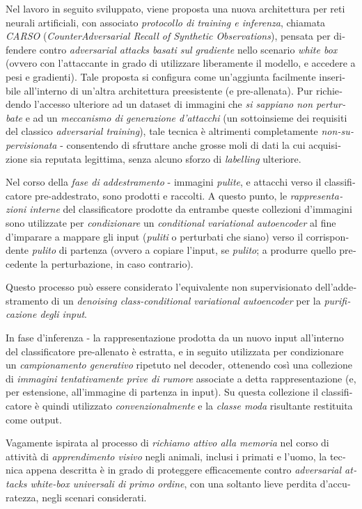 \begin{otherlanguage}{italian}
Nel lavoro in seguito sviluppato, viene proposta una nuova architettura per reti neurali artificiali, con associato \textit{protocollo di training e inferenza}, chiamata \textit{CARSO} (\textit{CounterAdversarial Recall of Synthetic Observations}), pensata per difendere contro \textit{adversarial attacks basati sul gradiente} nello scenario \textit{white box} (ovvero con l'attaccante in grado di utilizzare liberamente il modello, e accedere a pesi e gradienti). Tale proposta si configura come un'aggiunta facilmente inseribile all'interno di un'altra architettura preesistente (e pre-allenata). Pur richiedendo l'accesso ulteriore ad un dataset di immagini che \textit{si sappiano non perturbate} e ad un \textit{meccanismo di generazione d'attacchi} (un sottoinsieme dei requisiti del classico \textit{adversarial training}), tale tecnica è altrimenti completamente \textit{non-supervisionata} - consentendo di sfruttare anche grosse moli di dati la cui acquisizione sia reputata legittima, senza alcuno sforzo di \textit{labelling} ulteriore.

Nel corso della \textit{fase di addestramento} - immagini \textit{pulite}, e attacchi verso il classificatore pre-addestrato, sono prodotti e raccolti. A questo punto, le \textit{rappresentazioni interne} del classificatore prodotte da entrambe queste collezioni d'immagini sono utilizzate per \textit{condizionare} un \textit{conditional variational autoencoder} al fine d'imparare a mappare gli input (\textit{puliti} o perturbati che siano) verso il corrispondente \textit{pulito} di partenza (ovvero a copiare l'input, se \textit{pulito}; a produrre quello precedente la perturbazione, in caso contrario).

Questo processo può essere considerato l'equivalente non supervisionato dell'addestramento di un \textit{denoising class-conditional variational autoencoder} per la \textit{purificazione degli input}.

In fase d'inferenza - la rappresentazione prodotta da un nuovo input all'interno del classificatore pre-allenato è estratta, e in seguito utilizzata per condizionare un \textit{campionamento generativo} ripetuto nel decoder, ottenendo così una collezione di \textit{immagini tentativamente prive di rumore} associate a detta rappresentazione (e, per estensione, all'immagine di partenza in input). Su questa collezione il classificatore è quindi utilizzato \textit{convenzionalmente} e la \textit{classe moda} risultante restituita come output.

Vagamente ispirata al processo di \textit{richiamo attivo alla memoria} nel corso di attività di \textit{apprendimento visivo} negli animali, inclusi i primati e l'uomo, la tecnica appena descritta è in grado di proteggere efficacemente contro \textit{adversarial attacks white-box universali di primo ordine}, con una soltanto lieve perdita d'accuratezza, negli scenari considerati.


\end{otherlanguage}
